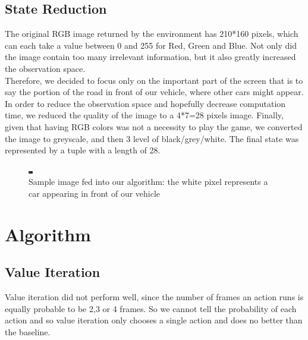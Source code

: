 \documentclass[10pt,twocolumn,letterpaper]{article}
\begin{document}
\subsection{State Reduction}

The original RGB image returned by the environment has 210*160 pixels, which can each take a value between 0 and 255 for Red, Green and Blue. Not only did the image contain too many irrelevant information, but it also greatly increased the observation space.\\
Therefore, we decided to focus only on the important part of the screen that is to say the portion of the road in front of our vehicle, where other cars might appear. In order to reduce the observation space and hopefully decrease computation time, we reduced the quality of the image to a 4*7=28 pixels image. Finally, given that having RGB colors was not a necessity to play the game, we converted the image to greyscale, and then 3 level of black/grey/white. The final state was represented by a tuple with a length of 28.

\begin{figure}[h]
\centering
\includegraphics[width=0.6\linewidth]{81.png}
\caption{Sample image fed into our algorithm: the white pixel represents a car appearing in front of our vehicle}
\end{figure}


\section{Algorithm}
\subsection{Value Iteration}
Value iteration did not perform well, since the number of frames an action runs is equally probable to be 2,3 or 4 frames. So we cannot tell the probability of each action and so value iteration only chooses a single action and does no better than the baseline.
\end{document}
